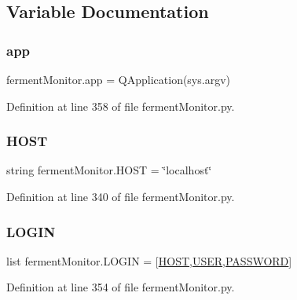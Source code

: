 \subsection{Variable Documentation}
\mbox{\label{namespaceferment_monitor_a2bb37bf747876f5619c602d8a6c952c2}} 
\subsubsection{\texorpdfstring{app}{app}}
{\footnotesize\ttfamily ferment\+Monitor.\+app = Q\+Application(sys.\+argv)}



Definition at line 358 of file ferment\+Monitor.\+py.

\mbox{\label{namespaceferment_monitor_aa797be38491f4fc55ab83583227d661f}} 
\subsubsection{\texorpdfstring{HOST}{HOST}}
{\footnotesize\ttfamily string ferment\+Monitor.\+H\+O\+ST = \char`\"{}localhost\char`\"{}}



Definition at line 340 of file ferment\+Monitor.\+py.

\mbox{\label{namespaceferment_monitor_ac0d7af2295b5bf29813e82d1152217c7}} 
\subsubsection{\texorpdfstring{LOGIN}{LOGIN}}
{\footnotesize\ttfamily list ferment\+Monitor.\+L\+O\+G\+IN = \mbox{[}\mbox{\hyperlink{namespaceferment_monitor_aa797be38491f4fc55ab83583227d661f}{H\+O\+ST}},\mbox{\hyperlink{namespaceferment_monitor_aa3dfafc218979411b8a36d3c0b13169e}{U\+S\+ER}},\mbox{\hyperlink{namespaceferment_monitor_a51f37fb775290bb08bddcd5565421263}{P\+A\+S\+S\+W\+O\+RD}}\mbox{]}}



Definition at line 354 of file ferment\+Monitor.\+py.

